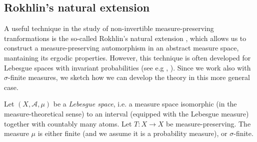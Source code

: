 \documentclass[11pt]{article}
\theoremstyle{definition}
\theoremstyle{remark}
\theoremstyle{plain}
\begin{document}
\subsection{Rokhlin's natural extension}\label{subsect-Rokhlin's-natural-ext}

A useful technique in the study of non-invertible measure-preserving tranformations is the so-called Rokhlin's natural extension \cite{Rohlin}, which allows us to construct a measure-preserving automorphism in an abstract measure space, mantaining its ergodic properties. However, this technique is often developed for {Lebesgue spaces} with invariant probabilities (see e.g \cite[Sect. 1.7]{PrzytyckiUrbanski} , \cite[Sect. 8.5]{UrbanskiRoyMunday1}). Since we  work also with $ \sigma $-finite measures, we sketch how we can develop the theory  in this more general case.

Let $ (X,\mathcal{A}, \mu) $ be a {\em Lebesgue space}, i.e. a  measure space isomorphic (in the measure-theoretical sense) to an interval (equipped with the Lebesgue measure) together with countably many atoms. Let   $ T\colon X\to X $ be measure-preserving. The measure $ \mu $ is either finite (and  we assume it is a probability measure), or  $ \sigma $-finite. 
\end{document}

